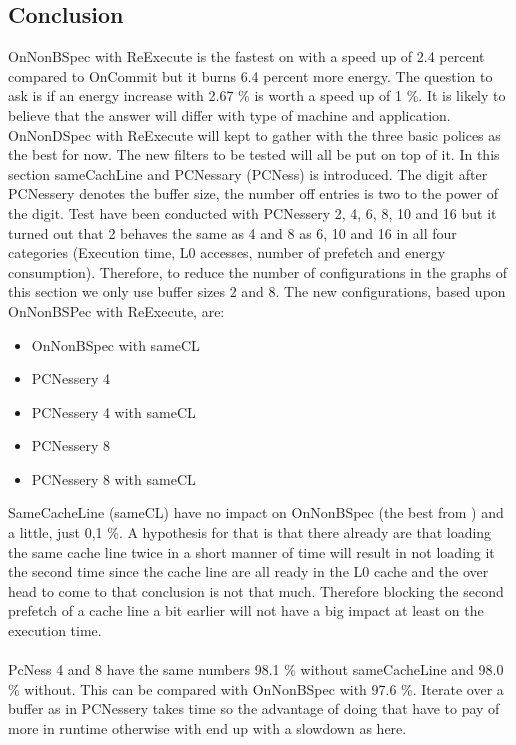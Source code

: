 \subsection{Conclusion}
OnNonBSpec with ReExecute is the fastest on with a speed up of 2.4 percent compared to OnCommit but it burns 6.4 percent more energy. The question to ask is if an energy increase with 2.67 \% is worth a speed up of 1 \%. It is likely to believe that the answer will differ with type of machine and application. OnNonDSpec with ReExecute will kept to gather with the three basic polices as the best for now. The new filters to be tested will all be put on top of it.
In this section sameCachLine and PCNessary (PCNess) is introduced. The digit after PCNessery denotes the buffer size, the number off entries is two to the power of the digit. Test have been conducted with PCNessery 2, 4, 6, 8, 10 and 16 but it turned out that 2 behaves the same as 4 and 8 as 6, 10 and 16 in all four categories (Execution time, L0 accesses, number of prefetch and energy consumption). Therefore, to reduce the number of configurations in the graphs of this section we only use buffer sizes 2 and 8. The new configurations, based upon OnNonBSPec with ReExecute, are:
\begin{itemize}
	\item OnNonBSpec with sameCL
	\item PCNessery 4
	\item PCNessery 4 with sameCL
	\item PCNessery 8
	\item PCNessery 8 with sameCL
\end{itemize}
\resExtime
{}
SameCacheLine (sameCL) have no impact on OnNonBSpec (the best from \fixme) and a little, just 0,1 \%. A hypothesis for that is that there already are  that loading the same cache line twice in a short manner of time will result in not loading it the second time since the cache line are all ready in the L0 cache and the over head to come to that conclusion is not that much. Therefore blocking the second prefetch of a cache line a bit earlier will not have a big impact at least on the execution time. 
\\ \\ 
PcNess 4 and 8 have the same numbers 98.1 \% without sameCacheLine and 98.0 \% without. This can be compared with OnNonBSpec with 97.6 \%. Iterate over a buffer as in PCNessery takes time so the advantage of doing that have to pay of more in runtime otherwise with end up with a slowdown as here. 

